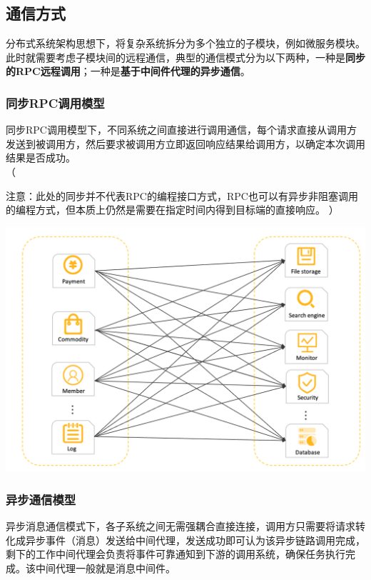 \documentclass[11pt, a4paper, oneside, fontset=none]{ctexbook}
\newenvironment{ignore}{%
  \color{gray}%
  \ignorespaces%
  （%
}{%
  ）%
  \ignorespacesafterend%
}
\begin{document}
\subsection{通信方式}
分布式系统架构思想下，将复杂系统拆分为多个独立的子模块，例如微服务模块。此时就需要考虑子模块间的远程通信，典型的通信模式分为以下两种，一种是{\bfseries\kaishu 同步的RPC远程调用}；一种是{\bfseries\kaishu 基于中间件代理的异步通信}。

\subsubsection{同步RPC调用模型}
同步RPC调用模型下，不同系统之间直接进行调用通信，每个请求直接从调用方发送到被调用方，然后要求被调用方立即返回响应结果给调用方，以确定本次调用结果是否成功。\\
\begin{ignore}
  注意：此处的同步并不代表RPC的编程接口方式，RPC也可以有异步非阻塞调用的编程方式，但本质上仍然是需要在指定时间内得到目标端的直接响应。
\end{ignore}

\begin{center}
  \begin{minipage}{\textwidth}
    \center
    \includegraphics[width=\textwidth]{picture/同步RPC调用模型.png}
    \captionsetup{hypcap=false}
    \label{fig:同步RPC调用模型}
  \end{minipage}
\end{center}

\subsubsection{异步通信模型}
异步消息通信模式下，各子系统之间无需强耦合直接连接，调用方只需要将请求转化成异步事件（消息）发送给中间代理，发送成功即可认为该异步链路调用完成，剩下的工作中间代理会负责将事件可靠通知到下游的调用系统，确保任务执行完成。该中间代理一般就是消息中间件。
\end{document}
